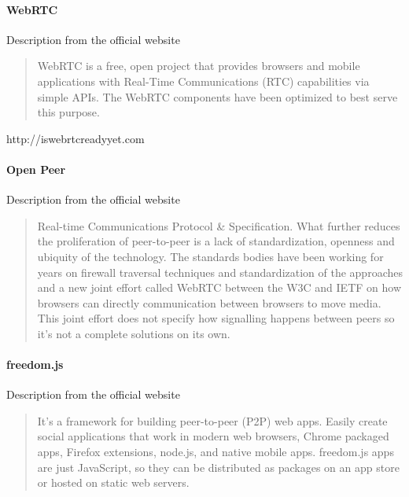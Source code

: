 \paragraph{WebRTC}
Description from the official website \cite{GoogleWebRTC}
\blockquote{WebRTC is a free, open project that provides browsers and mobile applications with Real-Time Communications (RTC) capabilities via simple APIs. The WebRTC components have been optimized to best serve this purpose.} http://iswebrtcreadyyet.com

\paragraph{Open Peer}
Description from the official website \cite{Hookflash2014OpenPeer}
\blockquote{
Real-time Communications Protocol \& Specification. What further reduces the proliferation of peer-to-peer is a lack of standardization, openness and ubiquity of the technology. The standards bodies have been working for years on firewall traversal techniques and standardization of the approaches and a new joint effort called WebRTC between the W3C and IETF on how browsers can directly communication between browsers to move media. This joint effort does not specify how signalling happens between peers so it’s not a complete solutions on its own.}

\paragraph{freedom.js}
Description from the official website \cite{Freedom.js2012Freedom.js}
\blockquote{It's a framework for building peer-to-peer (P2P) web apps. Easily create social applications that work in modern web browsers, Chrome packaged apps, Firefox extensions, node.js, and native mobile apps. freedom.js apps are just JavaScript, so they can be distributed as packages on an app store or hosted on static web servers.}


